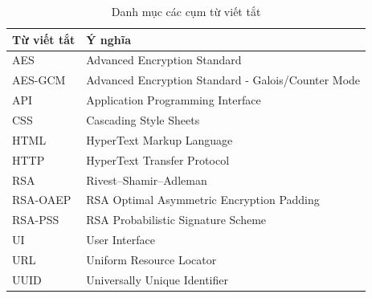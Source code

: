 
\begin{table}[H]
\centering
\caption{Danh mục các cụm từ viết tắt}

\begin{tabular}{|p{4cm}|p{10cm}|}
\hline
\centering\textbf{Từ viết tắt} &
\centering\arraybackslash\textbf{Ý nghĩa} \\
\hline

AES & Advanced Encryption Standard \\
\hline

AES-GCM & Advanced Encryption Standard - Galois/Counter Mode \\
\hline

API & Application Programming Interface \\
\hline

CSS & Cascading Style Sheets \\
\hline

HTML & HyperText Markup Language \\
\hline

HTTP & HyperText Transfer Protocol \\
\hline

RSA & Rivest–Shamir–Adleman \\
\hline

RSA-OAEP & RSA Optimal Asymmetric Encryption Padding \\
\hline

RSA-PSS & RSA Probabilistic Signature Scheme \\
\hline

UI & User Interface \\
\hline

URL & Uniform Resource Locator \\
\hline

UUID & Universally Unique Identifier \\
\hline

\end{tabular}

\end{table}